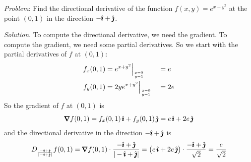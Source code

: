 \begin{eg}\label{eg dir deriv A}
\noindent\textit{Problem}:
Find the directional derivative of the function $f(x,y)=e^{x+y^2}$
at the point $(0,1)$ in the direction $-\hat{\pmb{\imath}} + \hat{\pmb{\jmath}}$.

\medskip
\noindent\textit{Solution}. 
To compute the directional derivative, we need the gradient.
To compute the gradient, we need some partial derivatives.
So we start with the partial derivatives of $f$ at $(0,1)$:
\begin{alignat*}{3}
f_x(0,1) &= e^{x+y^2}\Big|_{x=0\atop y=1} &&=e \\
f_y(0,1) &= 2ye^{x+y^2}\Big|_{x=0\atop y=1} &&=2e 
\end{alignat*}
So the gradient of $f$ at $(0,1)$ is
\begin{equation*}
\vnabla f(0,1) = f_x(0,1)\,\hi + f_y(0,1)\,\hj 
               = e\,\hi + 2e\,\hj
\end{equation*}
and the directional derivative in the direction $-\hat{\pmb{\imath}} + \hat{\pmb{\jmath}}$ is
\begin{equation*}
D_{\frac{-\hi+\hj}{|-\hi+\hj|}} f(0,1) 
   = \vnabla f(0,1)\cdot\frac{-\hi+\hj}{|-\hi+\hj|}
   = \big(e\,\hi + 2e\,\hj\big)\cdot \frac{-\hi+\hj}{\sqrt{2}}
   = \frac{e}{\sqrt{2}}
\end{equation*}

\end{eg}


